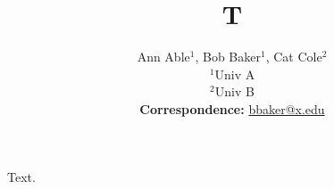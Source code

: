 \documentclass{article}
\title{T}
\author{Ann Able$^1$, Bob Baker$^1$, Cat Cole$^2$ \\ $^1$Univ A \\ $^2$Univ B \\
\textbf{Correspondence:} \href{bbaker@x.edu}{bbaker@x.edu}}
\begin{document}
\maketitle
Text.
\end{document}

